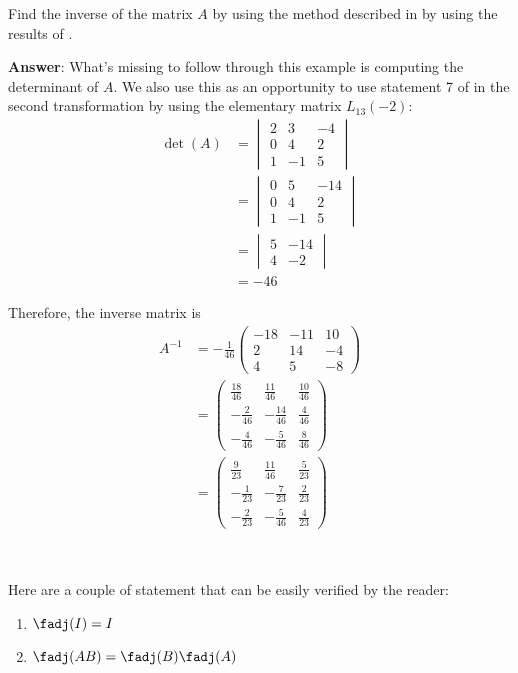 \begin{exm}
	Find the inverse of the matrix $A$ by using the method described in
	 by using the results of
	.
	\begin{flushleft}
		\textbf{Answer}: What's missing to follow through this example is computing
		the determinant of $A$. We also use this as an opportunity to use statement 7
		of  in the second transformation
		by using the elementary matrix $L_{13}(-2)$:
		\begin{align*}
			\det(A) & =\begin{vmatrix}
				2 & 3  & -4 \\
				0 & 4  & 2  \\
				1 & -1 & 5
			\end{vmatrix} \\
			        & =\begin{vmatrix}
				0 & 5  & -14 \\
				0 & 4  & 2   \\
				1 & -1 & 5
			\end{vmatrix} \\
			        & =\begin{vmatrix}
				5 & -14 \\
				4 & -2
			\end{vmatrix} \\
			        & =-46
		\end{align*}
	\end{flushleft}
	Therefore, the inverse matrix is
	\begin{align*}
		A^{-1} & =-\frac{1}{46}\begin{pmatrix}
			-18 & -11 & 10 \\
			2   & 14  & -4 \\
			4   & 5   & -8
		\end{pmatrix} \\
		       & =\begin{pmatrix}
			\frac{18}{46} & \frac{11}{46}  & \frac{10}{46} \\[4pt]
			-\frac{2}{46} & -\frac{14}{46} & \frac{4}{46}  \\[4pt]
			-\frac{4}{46} & -\frac{5}{46}  & \frac{8}{46}
		\end{pmatrix}              \\
		       & =\begin{pmatrix}
			\frac{9}{23}  & \frac{11}{46} & \frac{5}{23} \\[4pt]
			-\frac{1}{23} & -\frac{7}{23} & \frac{2}{23} \\[4pt]
			-\frac{2}{23} & -\frac{5}{46} & \frac{4}{23}
		\end{pmatrix}
	\end{align*}
\end{exm}\

\begin{rem}\label{rem-adj-properties}
	Here are a couple of statement that can be easily verified by the reader:
	\begin{enumerate}
		\item $\fadj(I)=I$
		\item $\fadj(AB)=\fadj(B)\fadj(A)$
	\end{enumerate}
\end{rem}
